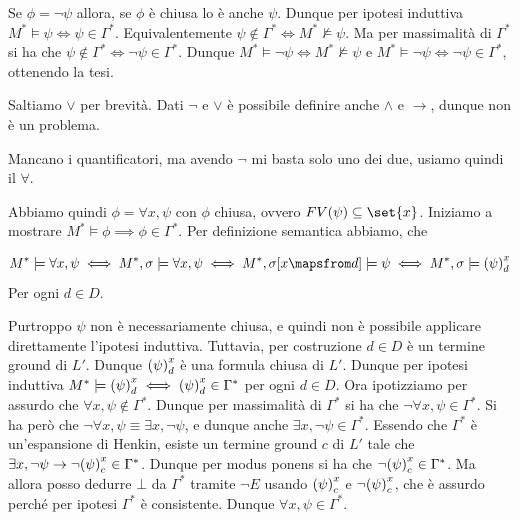 Se \(\phi = \neg \psi\) allora, se \(\phi\) è chiusa lo è anche \(\psi\). Dunque per ipotesi induttiva \(M^* \models \psi \iff \psi \in \Gamma^*\). Equivalentemente \(\psi \notin \Gamma^* \iff M^* \not\models \psi\). Ma per massimalità di \(\Gamma^*\) si ha che \(\psi \notin \Gamma^* \iff \neg \psi \in \Gamma^*\). Dunque \(M^* \models \neg \psi \iff M^* \not\models \psi\) e \(M^* \models \neg \psi \iff \neg \psi \in \Gamma^*\), ottenendo la tesi.

Saltiamo \(\lor\) per brevità. Dati \(\neg\) e \(\lor\) è possibile definire anche \(\land\) e \(\to\), dunque non è un problema.

Mancano i quantificatori, ma avendo \(\neg\) mi basta solo uno dei due, usiamo quindi il \(\forall\).

Abbiamo quindi \(\phi = \forall x, \psi\) con \(\phi\) chiusa, ovvero \(FV(\psi) \subseteq \set{x}\). Iniziamo a mostrare \(M^* \models \phi \implies \phi \in \Gamma^*\). Per definizione semantica abbiamo, che

\[M^* \models \forall x, \psi \iff M^* ,\sigma \models \forall x, \psi \iff M^* ,\sigma[x\mapsfrom d] \models \psi \iff M^*,\sigma \models \subs{\psi}{x}{d}\]
Per ogni \(d \in D\).

Purtroppo \(\psi\) non è necessariamente chiusa, e quindi non è possibile applicare direttamente l'ipotesi induttiva. Tuttavia, per costruzione \(d \in D\) è un termine ground di \(L'\). Dunque \({{\left(\psi\right)}^{x}_{d}}\) è una formula chiusa di \(L'\). Dunque per ipotesi induttiva \(M^* \models {{\left(\psi\right)}^{x}_{d}} \iff {{\left(\psi\right)}^{x}_{d}} \in \Gamma^*\) per ogni \(d\in D\). Ora ipotizziamo per assurdo che \(\forall x, \psi \notin \Gamma^*\). Dunque per massimalità di \(\Gamma^*\) si ha che \(\neg \forall x, \psi \in \Gamma^*\). Si ha però che \(\neg \forall x, \psi\equiv \exists x, \neg \psi\), e dunque anche \(\exists x, \neg \psi \in \Gamma^*\). Essendo che \(\Gamma^*\) è un'espansione di Henkin, esiste un termine ground \(c\) di \(L'\) tale che \(\exists x, \neg \psi \to \neg {{\left(\psi\right)}^{x}_{c}} \in \Gamma^*\). Dunque per modus ponens si ha che \(\neg {{\left(\psi\right)}^{x}_{c}} \in \Gamma^*\). Ma allora posso dedurre \(\bot\) da \(\Gamma^*\) tramite \(\neg E\) usando \({{\left(\psi\right)}^{x}_{c}}\) e \(\neg {{\left(\psi\right)}^{x}_{c}}\), che è assurdo perché per ipotesi \(\Gamma^*\) è consistente. Dunque \(\forall x, \psi \in \Gamma^*\).

